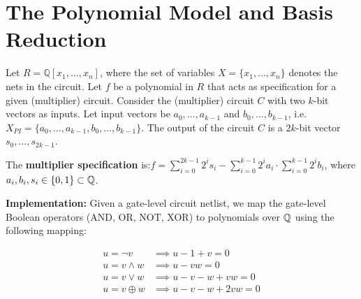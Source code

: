 



\vspace{-0.25in}

\section{The Polynomial Model and \Grobner Basis Reduction}
\label{verif}

\vspace{-0.15in}

Let $R = \mathbb{Q}[x_1,\dots,x_n]$, where the set of variables $X =
\{x_1,\dots,x_n\}$ denotes the nets in the circuit. Let $f$ be a
polynomial in $R$ that acts as specification for a given (multiplier) 
circuit. Consider the (multiplier) circuit $C$ with two $k$-bit
vectors as inputs. Let input vectors be $a_0,\dots,a_{k-1}$ and
$b_0,\dots,b_{k-1}$,
i.e. $X_{PI}=\{a_0,\dots,a_{k-1},b_0,\dots,b_{k-1}\}$. The output of
the circuit $C$ is a $2k$-bit vector $s_0,\dots,s_{2k-1}$. 

The \textbf{multiplier specification} is:$ f = \sum_{i=0}^{2k-1}
2^is_i-\sum_{i=0}^{k-1} 2^ia_i\cdot \sum_{i=0}^{k-1} 2^ib_i$, 
where $a_i,b_i,s_i \in \{0,1\} \subset {\mathbb{Q}}$.

\textbf{Implementation:} Given a gate-level circuit netlist, we map the gate-level Boolean
operators (AND, OR, NOT, XOR) to polynomials over ${\mathbb{Q}}$ using the following mapping:

\vspace{-0.2in}
{\small
\begin{equation}
\begin{split}
u = \neg v & \implies u - 1 + v = 0\\
u = v \land  w & \implies u - vw = 0 \\
u = v \lor w & \implies u - v - w + vw = 0 \\
u = v \oplus w & \implies u - v - w + 2vw = 0
\end{split}
\label{eq: gates}
\end{equation}
}

